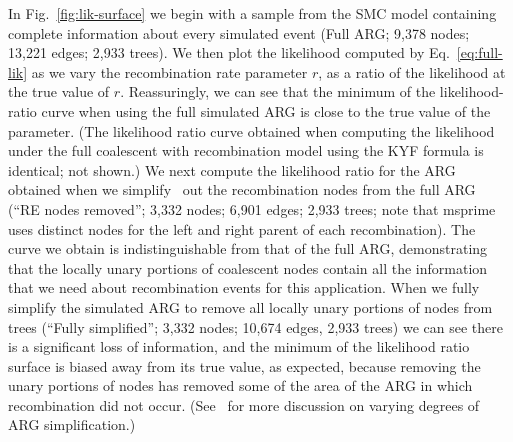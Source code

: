 \documentclass{article}
\begin{document}
In Fig.~\ref{fig:lik-surface} we begin 
with a sample from the SMC model 
containing complete information about every simulated event
(Full ARG; 9,378 nodes; 13,221 edges; 2,933 trees). 
We then plot the likelihood computed by Eq.~\eqref{eq:full-lik}
as we vary the recombination rate parameter $r$, as a ratio
of the likelihood at the true value of $r$.
Reassuringly, we can
see that the minimum of the likelihood-ratio curve when using the
full simulated ARG is close to the true value of the parameter.
(The likelihood ratio curve obtained when computing the likelihood
under the full coalescent with recombination model using the KYF
formula is identical; not shown.)
We next compute the likelihood ratio for the ARG obtained when we
simplify~\citep{kelleher_efficient_2018,wong_general_2023}
 out the recombination nodes from the full ARG
(``RE nodes removed''; 3,332 nodes; 6,901 edges; 2,933 trees; note that msprime
uses distinct nodes for the left and right parent of each recombination).
The curve we obtain is indistinguishable from that of the full
ARG, demonstrating that the locally unary portions of coalescent nodes
contain all the information that we need about recombination events
for this application. 
When we fully simplify the simulated ARG
to remove all locally unary portions of nodes from trees
(``Fully simplified''; 3,332 nodes; 10,674 edges, 2,933 trees)  
we can see there is a significant loss of information, 
and the minimum of the
likelihood ratio surface is biased away from its true value,
as expected, because removing the unary portions of nodes has removed some of the area
of the ARG in which recombination did not occur.
(See~\cite{wong_general_2023} for more discussion on varying
degrees of ARG simplification.)
\end{document}
